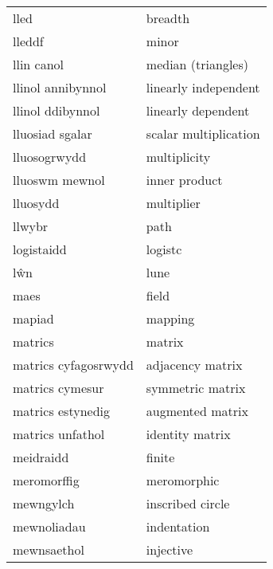 \begin{supertabular}{p{0.22\textwidth}p{0.22\textwidth}}
                            lled &                           breadth \\
                          lleddf &                             minor \\
                      llin canol &                median (triangles) \\
               llinol annibynnol &              linearly independent \\
                llinol ddibynnol &                linearly dependent \\
                 lluosiad sgalar &             scalar multiplication \\
                    lluosogrwydd &                      multiplicity \\
                  lluoswm mewnol &                     inner product \\
                        lluosydd &                        multiplier \\
                          llwybr &                              path \\
                      logistaidd &                           logistc \\
                             lŵn &                              lune \\
                            maes &                             field \\
                          mapiad &                           mapping \\
                         matrics &                            matrix \\
            matrics cyfagosrwydd &                  adjacency matrix \\
                 matrics cymesur &                  symmetric matrix \\
               matrics estynedig &                  augmented matrix \\
                matrics unfathol &                   identity matrix \\
                       meidraidd &                            finite \\
                     meromorffig &                       meromorphic \\
                       mewngylch &                  inscribed circle \\
                     mewnoliadau &                       indentation \\
                     mewnsaethol &                         injective \\

\end{supertabular}
